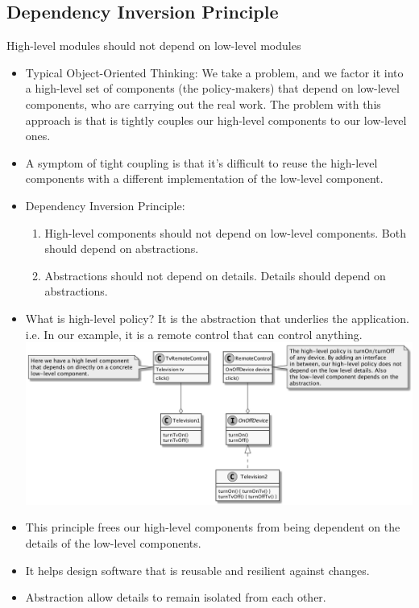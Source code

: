 \documentclass[11pt]{article}
\begin{document}
    \subsection{Dependency Inversion Principle}
    High-level modules should not depend on low-level modules
    \begin{itemize}
        \item Typical Object-Oriented Thinking: We take a problem, and we factor it into a high-level set of components
        (the policy-makers) that depend on low-level components, who are carrying out the real work. The problem with
        this approach is that is tightly couples our high-level components to our low-level ones.
        \item A symptom of tight coupling is that it's difficult to reuse the high-level components with a different implementation
        of the low-level component.
        \item Dependency Inversion Principle:
        \begin{enumerate}
            \item High-level components should not depend on low-level components. Both should depend on abstractions.
            \item Abstractions should not depend on details. Details should depend on abstractions.
        \end{enumerate}
        \item What is high-level policy? It is the abstraction that underlies the application. i.e. In our example, it
        is a remote control that can control anything. \\
        \includegraphics[scale=0.2]{dependency_inversion_principle}
        \item This principle frees our high-level components from being dependent on the details of the low-level
        components.
        \item It helps design software that is reusable and resilient against changes.
        \item Abstraction allow details to remain isolated from each other.
    \end{itemize}
\end{document}
